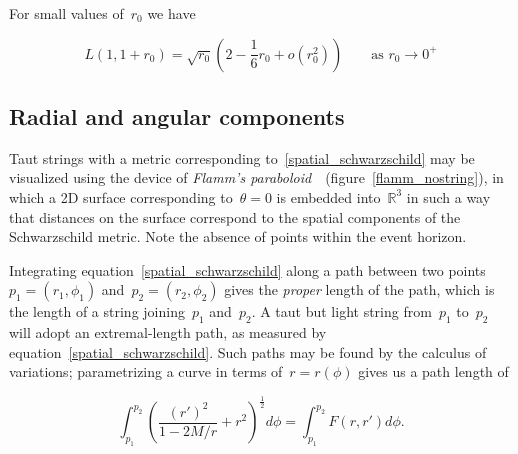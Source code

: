 \documentclass[prb,preprint]{revtex4-1}
\begin{document}
%
%
%


For small values of~$r_0$ we have 

\begin{equation}\label{proper_string_length_small_r}
L\left(1,1+r_0\right) =   \sqrt{r_0}\left(2 - \frac{1}{6}r_0+ o\left(r_0^2\right)\right)\qquad\mbox{as $r_0\longrightarrow 0^+$}
\end{equation}







\subsection{Radial and angular components}

Taut strings with a metric corresponding
to~\ref{spatial_schwarzschild} may be visualized using the device of
{\em Flamm's paraboloid\,}~\cite{flamm1916}
(figure~\ref{flamm_nostring}), in which a 2D surface corresponding
to~$\theta=0$ is embedded into~$\mathbb{R}^3$ in such a way that
distances on the surface correspond to the spatial components of the
Schwarzschild metric.  Note the absence of points within the event
horizon.

Integrating equation~\ref{spatial_schwarzschild} along a path between
two points~$p_1=\left(r_1,\phi_1\right)$
and~$p_2=\left(r_2,\phi_2\right)$ gives the {\em proper} length of the
path, which is the length of a string joining~$p_1$ and~$p_2$.  A taut
but light string from~$p_1$ to~$p_2$ will adopt an extremal-length
path, as measured by equation~\ref{spatial_schwarzschild}.  Such paths
may be found by the calculus of variations; parametrizing a curve in
terms of~$r=r\left(\phi\right)$ gives us a path length of

\begin{equation}
  \int_{p_1}^{p_2}\left(\frac{\left(r'\right)^2}{1-2M/r} + r^2\right)^\frac{1}{2}d\phi=
  \int_{p_1}^{p_2}F\left(r,r'\right)d\phi.
\end{equation}
\end{document}
